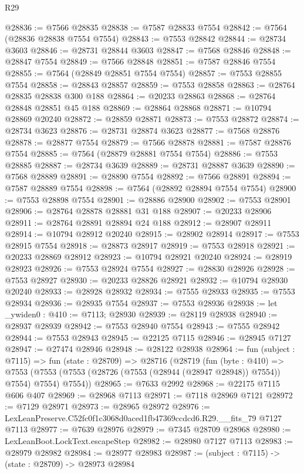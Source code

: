 \begin{lexlean}{R29}
\begin{coremodule}
@28836 := @7566 @28835
@28838 := @7587 @28833 @7554
@28842 := @7564 (@28836 @28838 @7554 @7554)
@28843 := @7553 @28842
@28844 := @28734 @3603
@28846 := @28731 @28844 @3603
@28847 := @7568 @28846
@28848 := @28847 @7554
@28849 := @7566 @28848
@28851 := @7587 @28846 @7554
@28855 := @7564 (@28849 @28851 @7554 @7554)
@28857 := @7553 @28855 @7554
@28858 := @28843 @28857
@28859 := @7553 @28858
@28863 := @28764 @28835 @28838 @300 @188
@28864 := @20233 @28863
@28868 := @28764 @28848 @28851 @45 @188
@28869 := @28864 @28868
@28871 := @10794 @28869 @20240
@28872 := @28859 @28871
@28873 := @7553 @28872
@28874 := @28734 @3623
@28876 := @28731 @28874 @3623
@28877 := @7568 @28876
@28878 := @28877 @7554
@28879 := @7566 @28878
@28881 := @7587 @28876 @7554
@28885 := @7564 (@28879 @28881 @7554 @7554)
@28886 := @7553 @28885
@28887 := @28734 @3639
@28889 := @28731 @28887 @3639
@28890 := @7568 @28889
@28891 := @28890 @7554
@28892 := @7566 @28891
@28894 := @7587 @28889 @7554
@28898 := @7564 (@28892 @28894 @7554 @7554)
@28900 := @7553 @28898 @7554
@28901 := @28886 @28900
@28902 := @7553 @28901
@28906 := @28764 @28878 @28881 @31 @188
@28907 := @20233 @28906
@28911 := @28764 @28891 @28894 @24 @188
@28912 := @28907 @28911
@28914 := @10794 @28912 @20240
@28915 := @28902 @28914
@28917 := @7553 @28915 @7554
@28918 := @28873 @28917
@28919 := @7553 @28918
@28921 := @20233 @28869 @28912
@28923 := @10794 @28921 @20240
@28924 := @28919 @28923
@28926 := @7553 @28924 @7554
@28927 := @28830 @28926
@28928 := @7553 @28927
@28930 := @20233 @28826 @28921
@28932 := @10794 @28930 @20240
@28933 := @28928 @28932
@28934 := @7555 @28933
@28935 := @7553 @28934
@28936 := @28935 @7554
@28937 := @7553 @28936
@28938 := let _ywiden0 : @410 := @7113; @28930
@28939 := @28119 @28938
@28940 := @28937 @28939
@28942 := @7553 @28940 @7554
@28943 := @7555 @28942
@28944 := @7553 @28943
@28945 := @22125 @7115
@28946 := @28945 @7127
@28947 := @27474 @28946
@28948 := @28122 @28938
@28964 := fun (subject : @7115) =>
  fun (state : @28709) =>
  @28716
    (@28719
      (fun (byte : @410) =>
      @7553 (@7553 (@7553 (@28726 (@7553 (@28944 (@28947 @28948)) @7554)) @7554) @7554) @7554))
@28965 := @7633 @2992
@28968 := @22175 @7115 @606 @407
@28969 := @28968 @7113
@28971 := @7118 @28969 @7121
@28972 := @7129 @28971
@28973 := @28965 @28972
@28976 := LexLeanPreserve.C52fc0f1c3068d0aced1fb47369ccdcd6.R29.__fits_79 @7127 @7113
@28977 := @7639 @28976
@28979 := @7345 @28709 @28968
@28980 := LexLeanBoot.LockText.escapeStep
@28982 := @28980 @7127 @7113
@28983 := @28979 @28982
@28984 := @28977 @28983
@28987 := (subject : @7115) -> (state : @28709) -> @28973 @28984

\end{coremodule}
\end{lexlean}
